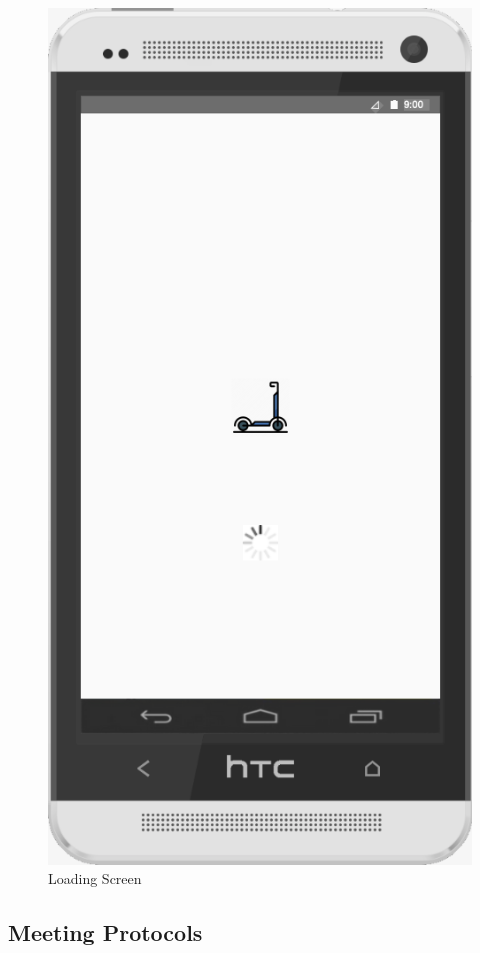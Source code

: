 \documentclass[a4paper, 12pt]{article}
\begin{document}
\begin{figure} [htbp]
  \begin{center}
    \includegraphics[scale=0.5]{images/prototypes/06-loading-screen.png}
  \end{center}
  \caption{Loading Screen}
\end{figure}

\subsection{Meeting Protocols}
\end{document}
